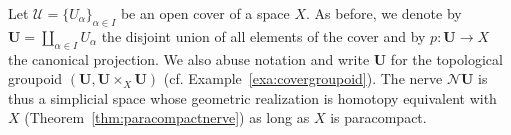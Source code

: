 \documentclass[a4paper,openany]{scrbook}
\DeclareMathOperator{\Open}{Open}
\newcommand{\nerve}{\mathcal N}
\begin{document}
Let $\mathcal U = \{U_\alpha\}_{\alpha \in I}$ be an open cover of a space $X$. As before, we denote by $\mathbf U = \coprod_{\alpha \in I} U_{\alpha}$ the disjoint union of all elements of the cover and by $p\colon \mathbf U \to X$ the canonical projection. We also abuse notation and write $\mathbf U$ for the topological groupoid $(\mathbf U, \mathbf U \times_X \mathbf U)$ (cf. Example~\ref{exa:covergroupoid}). The nerve $\nerve\mathbf U$ is thus a simplicial space whose geometric realization is homotopy equivalent with $X$ (Theorem~\ref{thm:paracompactnerve}) as long as $X$ is paracompact.

%


\end{document}
